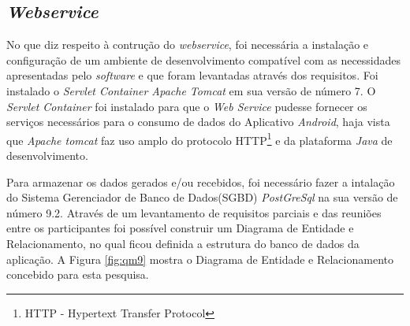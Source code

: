 \subsection{\textit{Webservice}}

\par No que diz respeito à contrução do \textit{webservice}, foi necessária a
instalação e configuração de um ambiente de desenvolvimento compatível com as
necessidades apresentadas pelo \textit{software} e que foram levantadas através
dos requisitos. Foi instalado o \textit{Servlet Container Apache Tomcat} em sua
versão de número 7. O \textit{Servlet Container} foi instalado para que o
\textit{Web Service} pudesse fornecer os serviços necessários para o consumo de
dados do Aplicativo \textit{Android}, haja vista que \textit{Apache tomcat} faz
uso amplo do protocolo HTTP\footnote{HTTP - Hypertext Transfer Protocol} e da
plataforma \textit{Java} de desenvolvimento.
			
		\par Para armazenar os dados gerados e/ou recebidos, foi necessário fazer a
	intalação do Sistema Gerenciador de Banco de Dados(SGBD) \textit{PostGreSql} na
	sua versão de número 9.2. Através de um levantamento de requisitos parciais e das
	reuniões entre os participantes foi possível construir um Diagrama de Entidade
	e Relacionamento, no qual ficou definida a estrutura do banco de dados da
	aplicação. A Figura \ref{fig:qm9} mostra o Diagrama de Entidade e
	Relacionamento concebido para esta pesquisa.

